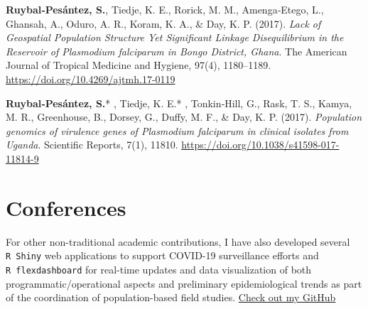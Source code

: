 \documentclass[11pt,a4paper,]{awesome-cv}
\begin{document}
\textbf{Ruybal‐Pesántez, S.}, Tiedje, K. E., Rorick, M. M.,
Amenga‐Etego, L., Ghansah, A., Oduro, A. R., Koram, K. A., \& Day, K. P.
(2017). \emph{Lack of Geospatial Population Structure Yet Significant
Linkage Disequilibrium in the Reservoir of Plasmodium falciparum in
Bongo District, Ghana}. The American Journal of Tropical Medicine and
Hygiene, 97(4), 1180--1189. \url{https://doi.org/10.4269/ajtmh.17-0119}

\textbf{Ruybal‐Pesántez, S.}* , Tiedje, K. E.* , Tonkin‐Hill, G., Rask,
T. S., Kamya, M. R., Greenhouse, B., Dorsey, G., Duffy, M. F., \& Day,
K. P. (2017). \emph{Population genomics of virulence genes of Plasmodium
falciparum in clinical isolates from Uganda}. Scientific Reports, 7(1),
11810. \url{https://doi.org/10.1038/s41598-017-11814-9}

\setlength{\leftskip}{0cm}

\newpage

\hypertarget{conferences}{%
\section{Conferences}\label{conferences}}

\footnotesize

For other non-traditional academic contributions, I have also developed
several \texttt{R\ Shiny} web applications to support COVID-19
surveillance efforts and \texttt{R\ flexdashboard} for real-time updates
and data visualization of both programmatic/operational aspects and
preliminary epidemiological trends as part of the coordination of
population-based field studies.
\href{https://github.com/shaziaruybal}{Check out my GitHub
\faExternalLink}
\end{document}
